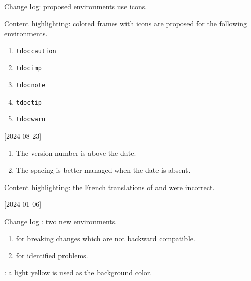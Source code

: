 \begin{tdocnew}
    \item Change log: proposed environments use icons.


    \item Content highlighting: colored frames with icons are proposed for the following environments.
    \bgroup
    \setlength\multicolsep{5pt}
    \begin{multicols}{3}
        \begin{enumerate}[topsep=0pt]
        	\item \verb#tdoccaution#
        	\item \verb#tdocimp#
        	\item \verb#tdocnote#
        	\item \verb#tdoctip#
        	\item \verb#tdocwarn#
        \end{enumerate}
    \end{multicols}
    \egroup
\end{tdocnew}

\tdocsep




[2024-08-23]

\begin{tdocupdate}
    \item {}
    \begin{enumerate}
        \item The version number is above the date.

        \item The spacing is better managed when the date is absent.
    \end{enumerate}
\end{tdocupdate}


\begin{tdocfix}
    \item Content highlighting: the French translations of  and  were incorrect.
\end{tdocfix}

\tdocsep




[2024-01-06]

\begin{tdocnew}
    \item Change log : two new environments.
    \begin{enumerate}
        \item {} for breaking changes which are not backward compatible.

        \item {} for identified problems.
    \end{enumerate}

    \item {}: a light yellow is used as the background color.
\end{tdocnew}

